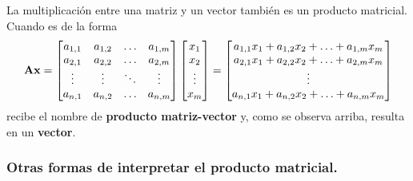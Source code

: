 \documentclass[12pt]{article}
\begin{document}
La multiplicación entre una matriz y un vector también es un producto matricial. Cuando es de la forma
\[
\mathbf{A}\mathbf{x} =
\begin{bmatrix}
a_{1, 1} & a_{1, 2} & \ldots & a_{1, m} \\
a_{2, 1} & a_{2, 2} & \ldots & a_{2, m} \\
\vdots & \vdots & \ddots & \vdots \\
a_{n, 1} & a_{n, 2} & \ldots & a_{n, m}
\end{bmatrix}
\begin{bmatrix}
x_{1} \\ x_{2} \\ \vdots \\ x_{m}
\end{bmatrix} =
\begin{bmatrix}
a_{1, 1}x_{1} + a_{1, 2}x_{2} + \ldots + a_{1, m}x_{m} \\
a_{2, 1}x_{1} + a_{2, 2}x_{2} + \ldots + a_{2, m}x_{m} \\
\vdots \\
a_{n, 1}x_{1} + a_{n, 2}x_{2} + \ldots + a_{n, m}x_{m}
\end{bmatrix}
\]
recibe el nombre de \textbf{producto matriz-vector} y, como se observa arriba, resulta en un \textbf{vector}.

\subsubsection{Otras formas de interpretar el producto matricial.}
\end{document}

